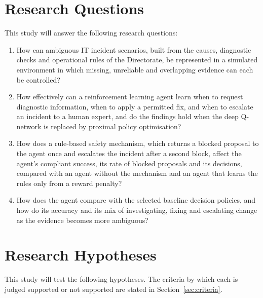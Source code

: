 \section{Research Questions}

This study will answer the following research questions:

\begin{enumerate}
\item How can ambiguous IT incident scenarios, built from the causes, diagnostic checks and operational rules of the Directorate, be represented in a simulated environment in which missing, unreliable and overlapping evidence can each be controlled?
\item How effectively can a reinforcement learning agent learn when to request diagnostic information, when to apply a permitted fix, and when to escalate an incident to a human expert, and do the findings hold when the deep Q-network is replaced by proximal policy optimisation?
\item How does a rule-based safety mechanism, which returns a blocked proposal to the agent once and escalates the incident after a second block, affect the agent's compliant success, its rate of blocked proposals and its decisions, compared with an agent without the mechanism and an agent that learns the rules only from a reward penalty?
\item How does the agent compare with the selected baseline decision policies, and how do its accuracy and its mix of investigating, fixing and escalating change as the evidence becomes more ambiguous?
\end{enumerate}

\section{Research Hypotheses}

This study will test the following hypotheses. The criteria by which each is judged supported or not supported are stated in Section~\ref{sec:criteria}.

